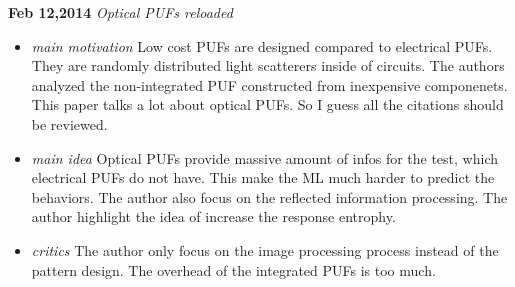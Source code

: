 \documentclass[]{article}
\begin{document}
\noindent \textbf{Feb 12,2014}
\textit{Optical PUFs reloaded}
\indent		\begin{itemize}
        \item \textit{main motivation}
            Low cost PUFs are designed compared to electrical PUFs. They are
            randomly distributed light scatterers inside of circuits. The
            authors analyzed the non-integrated PUF constructed from inexpensive
            componenets. This paper talks a lot about optical PUFs. So I guess
            all the citations should be reviewed.
          
        \item \textit{main idea}
            Optical PUFs provide massive amount of infos for the test, which
            electrical PUFs do not have. This make the ML much harder to predict
            the behaviors. The author also focus on the reflected information
            processing. The author highlight the idea of increase the response
            entrophy.

        \item \textit{critics}
            The author only focus on the image processing process instead of the
            pattern design. The overhead of the integrated PUFs is too much.
            
        \end{itemize}
\end{document}
